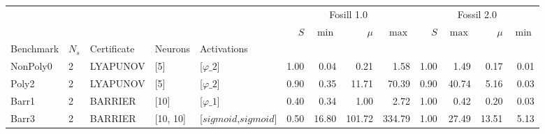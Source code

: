 \begin{tabular}{lllllrrrrrrrr}
    \toprule
              &       &             &          &                       & \multicolumn{4}{c}{Fosill 1.0} & \multicolumn{4}{c}{Fossil 2.0}                                                    \\
              &       &             &          &                       & $S$                            & $\min$                         & $\mu$  & $\max$ & $S$  & $\max$ & $\mu$ & $\min$ \\
    Benchmark & $N_s$ & Certificate & Neurons  & Activations           &                                &                                &        &        &      &        &       &        \\
    \midrule
    NonPoly0  & 2     & LYAPUNOV    & [5]      & [$\varphi\_{2}$]      & 1.00                           & 0.04                           & 0.21   & 1.58   & 1.00 & 1.49   & 0.17  & 0.01   \\
    \cline{1-13} \cline{2-13} \cline{3-13} \cline{4-13}
    Poly2     & 2     & LYAPUNOV    & [5]      & [$\varphi\_{2}$]      & 0.90                           & 0.35                           & 11.71  & 70.39  & 0.90 & 40.74  & 5.16  & 0.03   \\
    \cline{1-13} \cline{2-13} \cline{3-13} \cline{4-13}
    Barr1     & 2     & BARRIER     & [10]     & [$\varphi\_{1}$]      & 0.40                           & 0.34                           & 1.00   & 2.72   & 1.00 & 0.42   & 0.20  & 0.03   \\
    \cline{1-13} \cline{2-13} \cline{3-13} \cline{4-13}
    Barr3     & 2     & BARRIER     & [10, 10] & [$sigmoid$,$sigmoid$] & 0.50                           & 16.80                          & 101.72 & 334.79 & 1.00 & 27.49  & 13.51 & 5.13   \\
    \cline{1-13} \cline{2-13} \cline{3-13} \cline{4-13}
    \bottomrule
\end{tabular}
